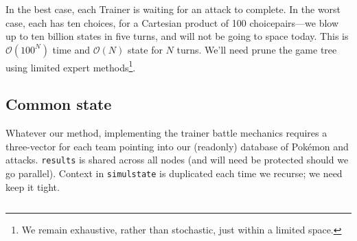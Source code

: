 In the best case, each Trainer is waiting for an attack to complete.
In the worst case, each has ten choices, for a Cartesian product of 100 choicepairs---we
  blow up to ten billion states in five turns, and will not be going to space today.
This is $\mathcal{O}(100^N)$ time and $\mathcal{O}(N)$ state for $N$ turns.
We'll need prune the game tree using limited expert methods\footnote{We remain exhaustive, rather than
 stochastic, just within a limited space.}.

\subsection{Common state\label{subsec:commonstate}}
Whatever our method, implementing the trainer battle mechanics requires a
  three-vector for each team pointing into our (readonly) database of Pokémon and attacks.
\texttt{results} is shared across all nodes (and will need be protected should we go parallel).
Context in \texttt{simulstate} is duplicated each time we recurse; we need keep it tight.
\inputminted{cpp}{s/simul.h}

